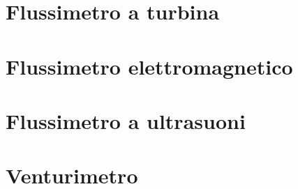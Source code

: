 \section{Flussimetro a turbina}
\section{Flussimetro elettromagnetico}
\section{Flussimetro a ultrasuoni}
\section{Venturimetro}